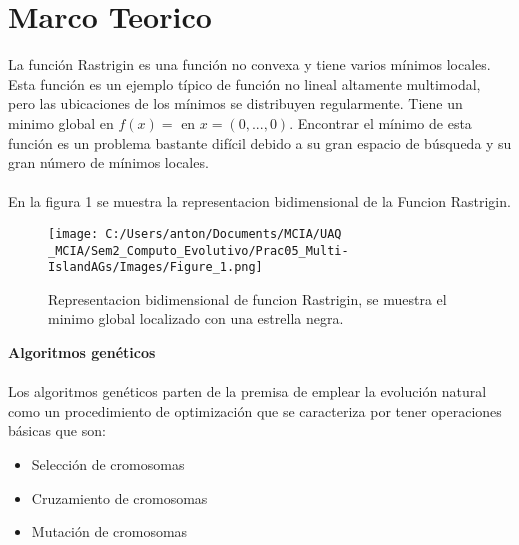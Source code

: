 \documentclass[10pt,letterpaper]{article}
\begin{document}
\section{Marco Teorico}
La función Rastrigin es una función no convexa y tiene varios mínimos locales. Esta función es un ejemplo típico de función no lineal altamente multimodal, pero las ubicaciones de los mínimos se distribuyen regularmente. Tiene un minimo global en $f(x)= $ en $x = (0,..., 0)$.
Encontrar el mínimo de esta función es un problema bastante difícil debido a su gran espacio de búsqueda y su gran número de mínimos locales.
\\\\
En la figura 1 se muestra la representacion bidimensional de la Funcion Rastrigin.

\begin{figure}[H]
	\centering
    \texttt{[image: C:/Users/anton/Documents/MCIA/UAQ \_MCIA/Sem2\_Computo\_Evolutivo/Prac05\_Multi-IslandAGs/Images/Figure\_1.png]}
    \caption{Representacion bidimensional de funcion Rastrigin, se muestra el minimo global localizado con una estrella negra.}
\end{figure}

\textbf{\large Algoritmos genéticos} 
\\\\
Los algoritmos genéticos parten de la premisa de emplear la evolución natural
como un procedimiento de optimización que se caracteriza por tener operaciones básicas que son:

\begin{itemize}
\item Selección de cromosomas
\item Cruzamiento de cromosomas
\item Mutación de cromosomas
\end{itemize}
\end{document}
